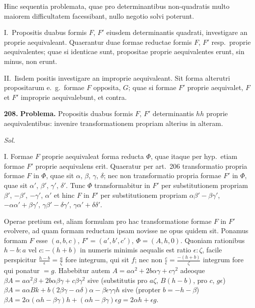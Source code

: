 \documentclass[12pt,a4paper]{article}
\theoremstyle{plain}
\theoremstyle{definition}
\theoremstyle{remark}
\begin{document}
Hinc sequentia problemata, quae pro determinantibus non-quadratis multo maiorem difficultatem facessibant, nullo negotio solvi poterunt.

I.\ Propositis duabus formis $F$, $F'$ eiusdem determinantis quadrati, investigare an proprie aequivaleant. Quaerantur duae formae reductae formis $F$, $F'$ resp.\ proprie aequivalentes; quae si identicae sunt, propositae proprie aequivalentes erunt, sin minus, non erunt.

II.\ Iisdem positis investigare an improprie aequivaleant. Sit forma alterutri propositarum e.\ g.\ formae $F$ opposita, $G$; quae si formae $F'$ proprie aequivalet, $F$ et $F'$ improprie aequivalebunt, et contra.

\textbf{208.}
\textbf{Problema.}
Propositis duabus formis $F$, $F'$ determinantis $hh$ proprie aequivalentibus: invenire transformationem propriam alterius in alteram.

\textit{Sol.}

I. Formae $F$ proprie aequivaleat forma reducta $\Phi$, quae itaque per hyp.\ etiam formae $F'$ proprie aequivalens erit. Quaeratur per art.\ 206 transformatio propria formae $F$ in $\Phi$, quae sit $\alpha$, $\beta$, $\gamma$, $\delta$; nec non transformatio propria formae $F'$ in $\Phi$, quae sit $\alpha'$, $\beta'$, $\gamma'$, $\delta'$. Tunc $\Phi$ transformabitur in $F'$ per substitutionem propriam $\beta'$, $-\beta'$, $-\gamma'$, $\alpha'$ et hinc $F$ in $F'$ per substitutionem propriam $\alpha\beta'-\beta\gamma'$, $-\alpha\alpha'+\beta\gamma'$, $\gamma\beta'-\delta\gamma'$, $\gamma\alpha'+\delta\delta'$.

Operae pretium est, aliam formulam pro hac transformatione formae $F$ in $F'$ evolvere, ad quam formam reductam ipsam novisse ne opus quidem sit. Ponamus formam $F$ esse $(a,b,c)$, $F'=(a',b',c')$, $\Phi=(A,h,0)$. Quoniam rationibus $h-b:a$ vel $c:-(h+b)$ in numeris minimis aequalis est ratio $\epsilon:\zeta$, facile perspicitur $\frac{h-b}{\epsilon} = \frac{a}{\zeta}$ fore integrum, qui sit $f$; nec non $\frac{c}{\epsilon} = \frac{-(h+b)}{\zeta}$ integrum fore qui ponatur $=g$. Habebitur autem $A=a\alpha^2+2b\alpha\gamma+c\gamma^2$ adeoque $\beta A = a\alpha^2\beta+2b\alpha\beta\gamma+c\beta\gamma^2$ sive (substitutis pro $a\zeta$, $B(h-b)$, pro $c$, $g\epsilon$) $\beta A = a\alpha B k+b(2\beta\gamma-\alpha\delta)\alpha-\beta\epsilon\gamma\gamma h$ sive (propter $b=-h-\beta$) $\beta A = 2\alpha(\alpha h-\beta\gamma)h+(\alpha h-\beta\gamma)\epsilon g = 2\alpha h+\epsilon g$.
\end{document}
